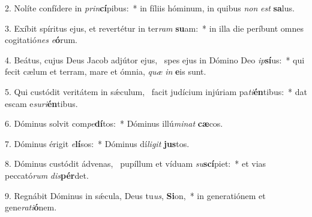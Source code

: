 2. Nolíte confídere in \textit{prin}\textbf{cí}pibus:~*  in fíliis hóminum, in quibus \textit{non} \textit{est} \textbf{sa}lus.\

3. Exíbit spíritus ejus, et revertétur in ter\textit{ram} \textbf{su}am:~*  in illa die períbunt omnes cogitatió\textit{nes} \textit{e}\textbf{ó}rum.\

4. Beátus, cujus Deus Jacob adjútor ejus, \dag\  spes ejus in Dómino Deo \textit{ip}\textbf{sí}us:~*  qui fecit cælum et terram, mare et ómnia, \textit{quæ} \textit{in} \textbf{e}is sunt.\

5. Qui custódit veritátem in sǽculum, \dag\  facit judícium injúriam pa\textit{ti}\textbf{én}tibus:~*  dat escam e\textit{su}\textit{ri}\textbf{én}tibus.\

6. Dóminus solvit com\textit{pe}\textbf{dí}tos:~*  Dóminus illú\textit{mi}\textit{nat} \textbf{cæ}cos.\

7. Dóminus érigit \textit{e}\textbf{lí}sos:~*  Dóminus dí\textit{li}\textit{git} \textbf{jus}tos.\

8. Dóminus custódit ádvenas, \dag\  pupíllum et víduam \textit{su}\textbf{scí}piet:~*  et vias peccató\textit{rum} \textit{dis}\textbf{pér}det.\

9. Regnábit Dóminus in sǽcula, Deus tu\textit{us}, \textbf{Si}on,~*  in generatiónem et gene\textit{ra}\textit{ti}\textbf{ó}nem.\

